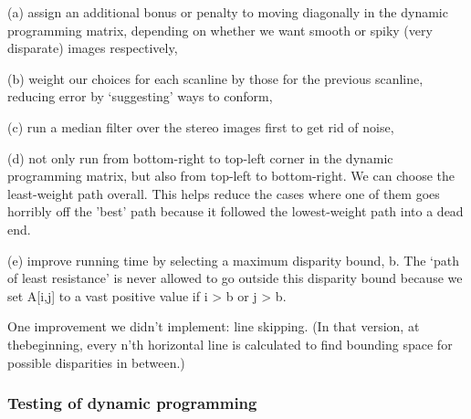 (a) assign an additional bonus or penalty to moving diagonally in the dynamic programming matrix, depending on whether we want smooth or spiky (very disparate) images respectively,

(b) weight our choices for each scanline by those for the previous scanline, reducing error by `suggesting' ways to conform,

(c) run a median filter over the stereo images first to get rid of noise,

(d) not only run from bottom-right to top-left corner in the dynamic programming matrix, but also from top-left to bottom-right. We can choose the least-weight path overall. This helps reduce the cases where one of them goes horribly off the 'best' path because it followed the lowest-weight path into a dead end.

(e) improve running time by selecting a maximum disparity bound, b. The `path of least resistance' is never allowed to go outside this disparity bound because we set A[i,j] to a vast positive value if i > b or j > b.

%

One improvement we didn't implement: line skipping. (In that version, at thebeginning, every n’th horizontal line is calculated to find bounding space for possible disparities in between.)

%

\subsubsection{Testing of dynamic programming}

